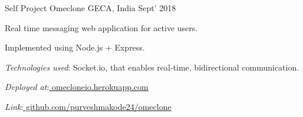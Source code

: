 

\begin{cventries}

  \cventry
    {Self Project}  
    {Omeclone} %
    {GECA, India} %
    {Sept’ 2018} %
    {
      \begin{cvitems} %
      	\item {Real time messaging web application for active users.}
        \item {Implemented using Node.js + Express.}
        \item {{\em Technologies used}: Socket.io, that enables real-time, bidirectional communication. }
        \item {{\em Deployed at}:\href{https://omecloneio.herokuapp.com/}{ omecloneio.herokuapp.com}}
        \item {{\em Link}:\href{https://github.com/purveshmakode24/omeclone}{ github.com/purveshmakode24/omeclone}} 
      \end{cvitems}
    }


\end{cventries}
